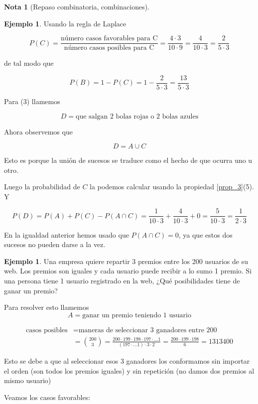 \documentclass[]{book}
\theoremstyle{plain}
\theoremstyle{definition}
\newtheorem{note}[theorem]{Nota}
\newtheorem{example}[theorem]{Ejemplo}
\begin{document}
\begin{note}[Repaso combinatoria, combinaciones]
\begin{example}
  Usando la regla de Laplace

  \[P(C) = \frac{\text{número casos favorables para C}}{\text{número casos posibles para C}} 
  = \frac{4\cdot 3 }{10\cdot 9}=\frac{4}{10\cdot 3}=\frac{2}{5\cdot 3}\]


  de tal modo que 

  \[P(B)= 1- P(C) = 1- \frac{2}{5\cdot 3} = \frac{13}{5\cdot 3}\]

  Para (3) llamemos 

  \[D = \text{que salgan 2 bolas rojas o 2 bolas azules}\]

  Ahora observemos que 

  \[D = A \cup C\]

  Esto es porque la unión de sucesos se traduce como el hecho de que ocurra uno u otro.

  Luego  la probabilidad de $C$ la podemos calcular usando la propiedad \ref{prop_3}(5). Y

  \[ P(D) = P(A) + P(C) - P(A\cap C) = \frac{1}{10\cdot 3} + \frac{4}{10\cdot 3} + 0 =  \frac{5}{10\cdot 3} =  \frac{1}{2\cdot 3}\]

  En la igualdad anterior hemos usado que $P(A\cap C)=0$, ya que estos dos sucesos no pueden darse a la vez.

\end{example}


\begin{example}
  Una empresa quiere repartir 3 premios entre los 200 usuarios de su web. Los premios son iguales y cada usuario puede recibir a lo sumo 1 premio.
  Si una persona tiene 1 usuario registrado en la web, ¿Qué posibilidades tiene de ganar un premio? 

  Para resolver esto llamemos
  $$A=\text{ganar un premio teniendo 1 usuario}$$

\begin{align*}
  \text{casos posibles}&= \text{maneras de seleccionar 3 ganadores entre 200}\\
  &={200 \choose 3} = \frac{200 \cdot 199 \cdot 198 \cdot 197 \cdot \ldots 1 }{(197 \cdot \ldots 1)\cdot 3\cdot 2} = \frac{200 \cdot 199 \cdot 198}{6} = 1313400
\end{align*}

Esto se debe a que al seleccionar esos 3 ganadores los conformamos sin importar el orden (son todos los premios iguales) y sin repetición (no damos dos premios al mismo usuario)
  
Veamos los casos favorables: 


\end{example}
\end{note}
\end{document}
